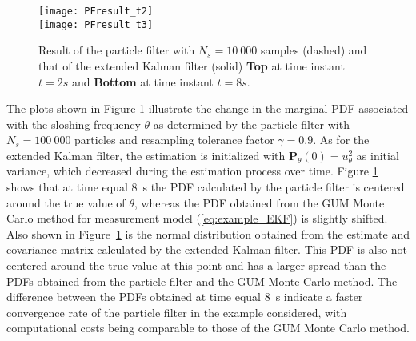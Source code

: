 \documentclass[10pt]{article}
\begin{document}
\begin{spacing}{1}
\begin{figure}[h!]
	\centering
	\texttt{[image: PFresult\_t2]}\\
	\texttt{[image: PFresult\_t3]}
	\label{fig:PFresults}
	\caption{Result of the particle filter with $N_s=10~000$ samples (dashed) and that of the extended Kalman filter (solid) \textbf{Top} at time instant $t=2 s$ and \textbf{Bottom} at time instant $t=8 s$.}
	\label{fig:PFresults}
\end{figure}


The plots shown in Figure \ref{fig:PFresults} illustrate the change in the marginal PDF associated with the sloshing frequency $\theta$ as determined by the particle filter with $N_s=100~000$ particles and resampling tolerance factor $\gamma=0.9$. As for the extended Kalman filter, the estimation is initialized with $\bm{P}_\theta(0)=u_\theta^2$ as initial variance, which decreased during the estimation process over time. 
Figure \ref{fig:PFresults} shows that at time equal $8$~s the PDF calculated by the particle filter is centered around the true value of $\theta$, whereas the PDF obtained from the GUM Monte Carlo method for measurement model (\ref{eq:example_EKF}) is slightly shifted. Also shown in Figure~\ref{fig:PFresults} is the normal distribution obtained from the estimate and covariance matrix calculated by the extended Kalman filter. This PDF is also not centered around the true value at this point and has a larger spread than the PDFs obtained from the particle filter and the GUM Monte Carlo method.
The difference between the PDFs obtained at time equal $8$~s indicate a faster convergence rate of the particle filter in the example considered, with computational costs being comparable to those of the GUM Monte Carlo method. 


\end{spacing}
\end{document}
